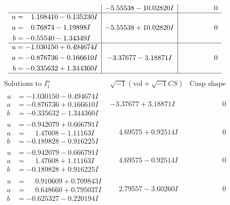 \documentclass[1p]{elsarticle_modified}
\theoremstyle{definition}
\newcommand{\I}{\sqrt{-1}}
\begin{document}
$$\begin{array}{c|c|c}
 & -5.55538 - 10.02820 I & \phantom{-0.000000 } 0 \\ \hline\begin{aligned}
u &= \phantom{-}1.108410 - 0.135230 I \\
a &= \phantom{-}0.76874 - 1.19898 I \\
b &= -0.55540 - 1.34349 I\end{aligned}
 & -5.55538 + 10.02820 I & \phantom{-0.000000 } 0 \\ \hline\begin{aligned}
u &= -1.030150 + 0.494674 I \\
a &= -0.876736 - 0.166610 I \\
b &= -0.335632 + 1.344360 I\end{aligned}
 & -3.37677 - 3.18871 I & \phantom{-0.000000 } 0\\
 \hline 
 \end{array}$$\newpage$$\begin{array}{c|c|c}  
\text{Solutions to }I^u_{1}& \I (\text{vol} + \sqrt{-1}CS) & \text{Cusp shape}\\
 \hline 
\begin{aligned}
u &= -1.030150 - 0.494674 I \\
a &= -0.876736 + 0.166610 I \\
b &= -0.335632 - 1.344360 I\end{aligned}
 & -3.37677 + 3.18871 I & \phantom{-0.000000 } 0 \\ \hline\begin{aligned}
u &= -0.942079 + 0.666791 I \\
a &= \phantom{-}1.47608 - 1.11163 I \\
b &= -0.189828 - 0.916225 I\end{aligned}
 & \phantom{-}4.69575 + 0.92514 I & \phantom{-0.000000 } 0 \\ \hline\begin{aligned}
u &= -0.942079 - 0.666791 I \\
a &= \phantom{-}1.47608 + 1.11163 I \\
b &= -0.189828 + 0.916225 I\end{aligned}
 & \phantom{-}4.69575 - 0.92514 I & \phantom{-0.000000 } 0 \\ \hline\begin{aligned}
u &= \phantom{-}0.910609 + 0.709843 I \\
a &= \phantom{-}0.648660 + 0.795037 I \\
b &= -0.625327 - 0.220194 I\end{aligned}
 & \phantom{-}2.79557 - 3.60260 I & \phantom{-0.000000 } 0 \\ \hline\begin{aligned}

\end{aligned}
\end{array}$$
\end{document}
